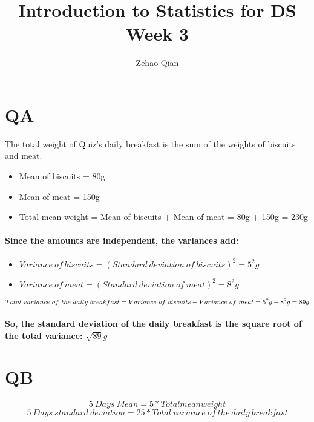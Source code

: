\documentclass[11pt]{article} %
\title{Introduction to Statistics for DS \\ Week 3}
\author{Zehao Qian}
\begin{document}
\maketitle


\section{QA}
The total weight of Quiz's daily breakfast is the sum of the weights of biscuits and meat.

\begin{itemize}
    \item Mean of biscuits = 80g
    \item Mean of meat = 150g
    \item Total mean weight = Mean of biscuits + Mean of meat = 80g + 150g = 230g
\end{itemize}

\paragraph{Since the amounts are independent, the variances add:}

\begin{itemize}
    \item $ Variance\ of\ biscuits = (Standard\ deviation\ of\ biscuits)^2 = 5^2g $
    \item $ Variance\ of\ meat = (Standard\ deviation\ of\ meat)^2 = 8^2g $
\end{itemize}


$$ Total\ variance\ of\ the\ daily\ breakfast \\ = Variance\ of\ biscuits + Variance\ of\ meat \\ = 5^2g + 8^2g = 89g $$


\paragraph{So, the standard deviation of the daily breakfast is the square root of the total variance: $ \sqrt{89}g$}
\section{QB}
$$ 5\ Days\ Mean = 5 * Total mean weight $$
$$ 5\ Days\ standard\ deviation= 25* Total\ variance\ of\ the\ daily\ breakfast$$
\end{document}
